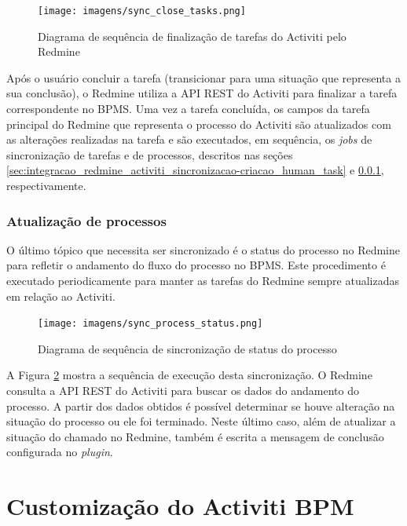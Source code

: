 \begin{figure}[H]
\centering
\texttt{[image: imagens/sync\_close\_tasks.png]}
\caption{Diagrama de sequência de finalização de tarefas do Activiti pelo Redmine}
\label{fig:close_bpm_tasks}
\end{figure}

Após o usuário concluir a tarefa (transicionar para uma situação que representa a sua conclusão), o Redmine utiliza a API REST do Activiti para finalizar a tarefa correspondente no BPMS. Uma vez a tarefa concluída, os campos da tarefa principal do Redmine que representa o processo do Activiti são atualizados com as alterações realizadas na tarefa e são executados, em sequência, os \textit{jobs} de sincronização de tarefas e de processos, descritos nas seções \ref{sec:integracao_redmine_activiti_sincronizacao-criacao_human_task} e \ref{sec:integracao_redmine_activiti_sincronizacao-status_processo}, respectivamente.

\subsubsection{Atualização de processos}\label{sec:integracao_redmine_activiti_sincronizacao-status_processo}

O último tópico que necessita ser sincronizado é o \textit{}{status} do processo no Redmine para refletir o andamento do fluxo do processo no BPMS. Este procedimento é executado periodicamente para manter as tarefas do Redmine sempre atualizadas em relação ao Activiti.

\begin{figure}[H]
\centering
\texttt{[image: imagens/sync\_process\_status.png]}
\caption{Diagrama de sequência de sincronização de status do processo}
\label{fig:sync_process_status}
\end{figure}

A Figura \ref{fig:sync_process_status} mostra a sequência de execução desta sincronização. O Redmine consulta a API REST do Activiti para buscar os dados do andamento do processo. A partir dos dados obtidos é possível determinar se houve alteração na situação do processo ou ele foi terminado. Neste último caso, além de atualizar a situação do chamado no Redmine, também é escrita a mensagem de conclusão configurada no \textit{plugin}.

\section{Customização do Activiti BPM}\label{sec:integracao_redmine_activiti-implementacao-activiti}

